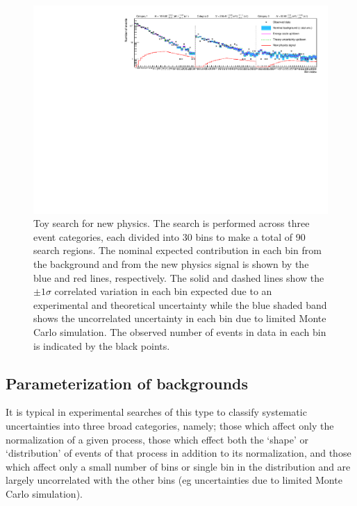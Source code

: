 \documentclass[11pt]{article}
\begin{document}
\begin{figure}%
\begin{center}
\includegraphics[width=\textwidth]{figures/t}
\end{center}
\caption{Toy search for new physics. The search is performed across three event categories, each divided into 30 bins to make a total of 90 search regions. The nominal expected contribution in each bin from the
background and from the new physics signal is shown by the blue and red lines, respectively. The solid and dashed lines show the $\pm1\sigma$ correlated variation in each bin expected due to an experimental and theoretical
uncertainty while the blue shaded band shows the uncorrelated uncertainty in each bin due to limited Monte Carlo simulation. The observed number of events in data in each bin is indicated by the black points.}
\label{fig:toy}
\end{figure}


\subsection{Parameterization of backgrounds}

It is typical in experimental searches of this type to classify systematic uncertainties into three broad categories, namely; those which affect only the normalization of a given process, those which effect both the
`shape' or `distribution' of events of that process in addition to its normalization, and those which affect only a small number of bins or single bin in the distribution and are largely uncorrelated with the other
bins (eg uncertainties due to limited Monte Carlo simulation).
\end{document}
